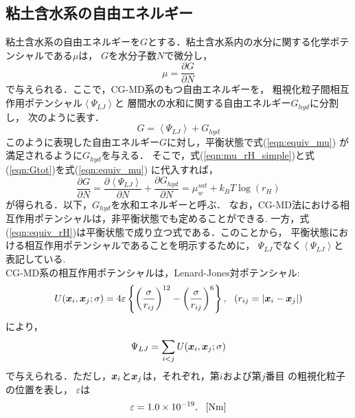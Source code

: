 \subsection{粘土含水系の自由エネルギー}
粘土含水系の自由エネルギーを$G$とする．粘土含水系内の水分に関する化学ポテンシャルである$\mu$は，
$G$を水分子数$N$で微分し，
\begin{equation}
	\mu=\frac{\partial G}{\partial N}
	\label{eqn:mu_GN}
\end{equation}
で与えられる．ここで，CG-MD系のもつ自由エネルギーを，
粗視化粒子間相互作用ポテンシャル$\left<\Psi_{LJ}\right>$と
層間水の水和に関する自由エネルギー$G_{hyd}$に分割し，
次のように表す．
\begin{equation}
	G=\left< \Psi_{LJ} \right> +G_{hyd}
	\label{eqn:Gtot}
\end{equation}
このように表現した自由エネルギー$G$に対し，平衡状態で式(\ref{eqn:equiv_mu})
が満足されるように$G_{hyd}$を与える．
そこで，式(\ref{eqn:mu_rH_simple})と式(\ref{eqn:Gtot})を式(\ref{eqn:equiv_mu})
に代入すれば，
\begin{equation}
	\frac{\partial G}{\partial N}
	=
	\frac{\partial \left< \Psi_{LJ}\right>}{\partial N}
	+
	\frac{\partial G_{hyd}}{\partial N}
	=
	\mu_w^{sat} +k_BT \log
	\left(
		r_H
	\right)
	\label{eqn:equiv_rH}
\end{equation}
が得られる．以下，$G_{hyd}$を水和エネルギーと呼ぶ．
なお，CG-MD法における相互作用ポテンシャルは，非平衡状態でも定めることができる.
一方，式(\ref{eqn:equiv_rH})は平衡状態で成り立つ式である．このことから，
平衡状態における相互作用ポテンシャルであることを明示するために，
$\Psi_{LJ}$でなく$\left< \Psi_{LJ}\right>$と表記している. \\
\hspace{\parindent}
CG-MD系の相互作用ポテンシャルは，Lenard-Jones対ポテンシャル:
\begin{equation}
	U(\mbox{\boldmath $x$}_i,\mbox{\boldmath $x$}_j; \sigma) 
	= 4 \varepsilon 
	\left\{ 
	\left(\frac{\sigma}{r_{ij}}\right)^{12}
	-
	\left(\frac{\sigma}{r_{ij}}\right)^6
	\right\}, \ \ \left( r_{ij}=\left| \mbox{\boldmath $x$}_i-\mbox{\boldmath $x$}_j\right| \right)
	\label{eqn:LJ}
\end{equation}
により，
\begin{equation}
	\Psi_{LJ}=\sum_{i<j} U(\mbox{\boldmath $x$}_i,\mbox{\boldmath $x$}_j; \sigma) 
	\label{eqn:def_PsiLJ}
\end{equation}
で与えられる．ただし，$\mbox{\boldmath $x$}_i$と$\mbox{\boldmath $x$}_j$は，それぞれ，第$i$および第$j$番目
の粗視化粒子の位置を表し，
$\varepsilon$は
\begin{equation}
	\varepsilon=1.0\times 10^{-19}, \ \ [{\rm Nm}]
	\label{eqn:eps_of_LJ}
\end{equation}
